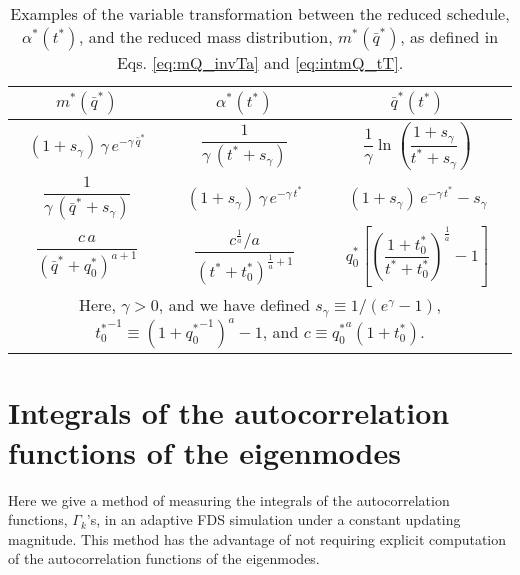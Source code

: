 \documentclass[reprint, superscriptaddress, floatfix]{revtex4-1}
\begin{document}
\begin{table}[h]
  \caption{\label{tab:m_and_a}
    Examples of the variable transformation between the
    reduced schedule, $\alpha^*(t^*)$,
    and the reduced mass distribution, $m^*(\bar q^*)$,
    as defined in Eqs. \eqref{eq:mQ_invTa}
    and \eqref{eq:intmQ_tT}.
  }
  \setlength{\tabcolsep}{2pt} %
  \renewcommand\arraystretch{2.0} %
  \begin{tabular} { c c c }
    \hline
    $m^*(\bar q^*)$ &
    $\alpha^*(t^*)$ &
    $\bar q^*(t^*)$
    \\
    \hline
    $(1+ s_\gamma) \, \gamma \, e^{-\gamma \, {\bar q}^*}$ &
    $\dfrac{1}{ \gamma \, (t^* + s_\gamma) }$ &
    $\dfrac{1}{\gamma} \ln\left(\dfrac{1 + s_\gamma}{t^* + s_\gamma} \right)$
    \\
    $\dfrac{1}{\gamma \, ({\bar q}^* + s_\gamma) }$ &
    $(1 + s_\gamma) \, \gamma \, e^{-\gamma \, t^*}$ &
    $(1 + s_\gamma) \, e^{-\gamma \, t^*} - s_\gamma$
    \\
    $\dfrac{c \, a}{\left( {\bar q}^* + q^*_0 \right)^{a+1}}$ &
    $\dfrac{c^{\frac 1 a} / a}{\left( t^* + t^*_0 \right)^{\frac{1}{a}+1}}$ &
    $q^*_0 \left[\left( \dfrac{1+t^*_0}{t^* + t^*_0} \right)^{\!\frac{1}{a}} \!- 1\right]$
    \\
    \hline
    \multicolumn{3}{p{8cm}}{
    Here,
    $\gamma > 0$,
    and we have defined
    $s_\gamma \equiv 1/(e^\gamma - 1)$,
    ${t^*_0}^{-1} \equiv \left(1+{q^*_0}^{-1}\right)^a - 1$,
    and
    $c \equiv {q^*_0}^a(1 + t^*_0)$.
    } \\
    \hline
  \end{tabular}
\end{table}




\section{\label{sec:Gamma_measure}
Integrals of the autocorrelation functions of the eigenmodes
}



Here we give a method of measuring
the integrals of the autocorrelation functions, $\Gamma_k$'s,
in an adaptive FDS simulation
under a constant updating magnitude.
%
This method has the advantage of not requiring
explicit computation of
the autocorrelation functions of the eigenmodes.
\end{document}

